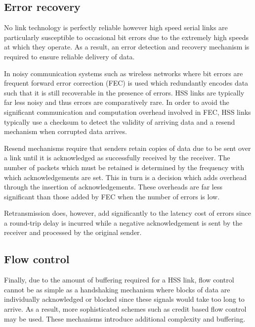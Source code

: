 		\subsection{Error recovery}
			
			No link technology is perfectly reliable however high speed serial links
			are particularly susceptible to occasional bit errors due to the extremely
			high speeds at which they operate. As a result, an error detection and
			recovery mechanism is required to ensure reliable delivery of data.
			
			In noisy communication systems such as wireless networks where bit errors
			are frequent forward error correction (FEC) is used which redundantly
			encodes data such that it is still recoverable in the presence of errors.
			HSS links are typically far less noisy and thus errors are comparatively
			rare.  In order to avoid the significant communication and computation
			overhead involved in FEC, HSS links typically use a checksum to detect the
			validity of arriving data and a resend mechanism when corrupted data
			arrives.
			
			Resend mechanisms require that senders retain copies of data due to be
			sent over a link until it is acknowledged as successfully received by the
			receiver. The number of packets which must be retained is determined by
			the frequency with which acknowledgements are set. This in turn is a
			decision which adds overhead through the insertion of acknowledgements.
			These overheads are far less significant than those added by FEC when the
			number of errors is low.
			
			Retransmission does, however, add significantly to the latency cost of
			errors since a round-trip delay is incurred while a negative
			acknowledgement is sent by the receiver and processed by the original
			sender.
		
		\subsection{Flow control}
			
			Finally, due to the amount of buffering required for a HSS link, flow
			control cannot be as simple as a handshaking mechanism where blocks of
			data are individually acknowledged or blocked since these signals would
			take too long to arrive. As a result, more sophisticated schemes such as
			credit based flow control \cite{dally04} may be used. These mechanisms
			introduce additional complexity and buffering.
